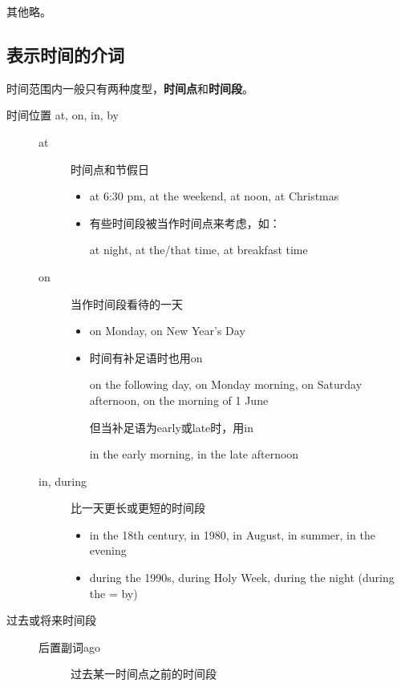 其他略。

\subsection{表示时间的介词}

时间范围内一般只有两种度型，\textbf{时间点}和\textbf{时间段}。

\begin{description}
\item[时间位置 at, on, in, by]
  \begin{description}

  \item[at] 时间点和节假日
    \begin{itemize}
    \item at 6:30 pm, at the weekend, at noon, at Christmas

    \item 有些时间段被当作时间点来考虑，如：

      at night, at the/that time, at breakfast time
    \end{itemize}

  \item[on] 当作时间段看待的一天
    \begin{itemize}
    \item on Monday, on New Year's Day


    \item 时间有补足语时也用on

      on the following day, on Monday morning, on Saturday afternoon, on the
      morning of 1 June

      但当补足语为early或late时，用in

      in the early morning, in the late afternoon
    \end{itemize}

  \item[in, during] 比一天更长或更短的时间段
    \begin{itemize}
    \item in the 18th century, in 1980, in August, in summer, in the evening

    \item during the 1990s, during Holy Week, during the night (during the = by)
    \end{itemize}
  \end{description}

\item[过去或将来时间段]
  \begin{description}
  \item[后置副词ago] 过去某一时间点之前的时间段


\end{description}
\end{description}
